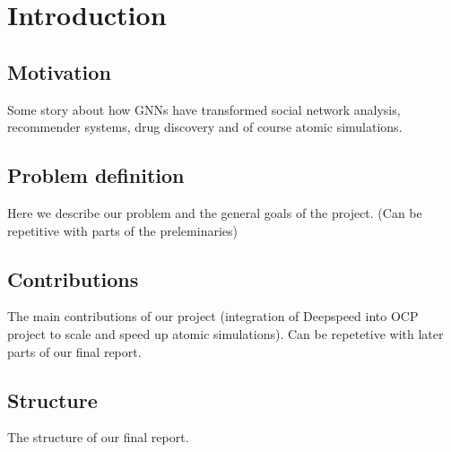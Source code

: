 \section{Introduction}

\subsection{Motivation}

Some story about how GNNs have transformed social network analysis, recommender systems, drug discovery and of course atomic simulations.

\subsection{Problem definition}

Here we describe our problem and the general goals of the project. (Can be repetitive with parts of the preleminaries)

\subsection{Contributions}

The main contributions of our project (integration of Deepspeed into OCP project to scale and speed up atomic simulations). 
Can be repetetive with later parts of our final report.

\subsection{Structure}

The structure of our final report.